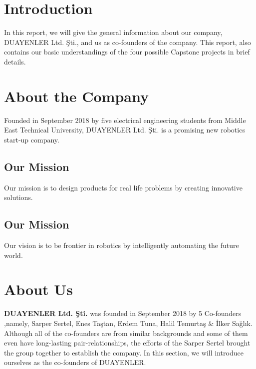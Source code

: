 \documentclass[a4paper,12pt]{article}
\newcommand{\blankpage}{
	\- \\[9cm]	
	{ \centering \textit{This page intentionally left blank.} \par }
	\- \\[9cm]
}%
\begin{document}
\tableofcontents
\newpage


\section{Introduction}
	In this report, we will give the general information about our company, DUAYENLER Ltd. Şti., and us as co-founders of the company. This report, also contains our basic understandings of the four possible Capstone projects in brief details.
	
\section{About the Company}
	Founded in September 2018 by five electrical engineering students from Middle East Technical University, DUAYENLER Ltd. Şti. is a promising new robotics start-up company.

\subsection{Our Mission}
Our mission is to design products for real life problems by creating innovative solutions.
	
\subsection{Our Mission}
Our vision is to be frontier in robotics by intelligently automating the future world.

\section{About Us}
	\textbf{DUAYENLER Ltd. Şti.} was founded in September 2018 by 5 Co-founders ,namely, Sarper Sertel, Enes Taştan, Erdem Tuna, Halil Temurtaş \& İlker Sağlık.   Although all of the co-founders are from similar backgrounds and some of them even have long-lasting pair-relationships, the efforts of the Sarper Sertel brought  the group together to establish the company.  In this section, we will introduce ourselves as the co-founders of DUAYENLER. \\%


\end{document}
